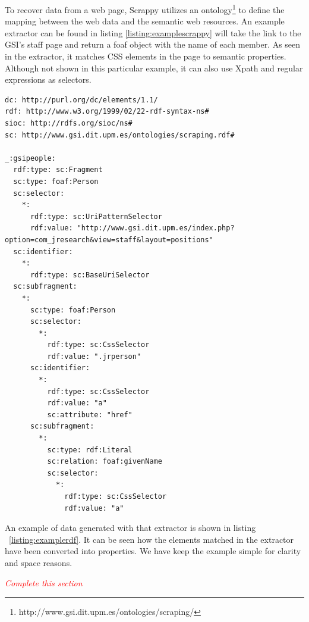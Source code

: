 To recover data from a web page, Scrappy utilizes an ontology\footnote{http://www.gsi.dit.upm.es/ontologies/scraping/} to define the mapping between the web data and the semantic web resources. An example extractor can be found in listing \ref{listing:examplescrappy} will take the link to the GSI's staff page and return a foaf object with the name of each member. As seen in the extractor, it matches CSS elements in the page to semantic properties. Although not shown in this particular example, it can also use Xpath and regular expressions as selectors.

\begin{center} 
  \begin{lstlisting}[language={}, captionpos=b, caption=Example extractor, label=listing:examplescrappy]   
dc: http://purl.org/dc/elements/1.1/
rdf: http://www.w3.org/1999/02/22-rdf-syntax-ns#
sioc: http://rdfs.org/sioc/ns#
sc: http://www.gsi.dit.upm.es/ontologies/scraping.rdf#

_:gsipeople:
  rdf:type: sc:Fragment
  sc:type: foaf:Person
  sc:selector:
    *:
      rdf:type: sc:UriPatternSelector
      rdf:value: "http://www.gsi.dit.upm.es/index.php?option=com_jresearch&view=staff&layout=positions"
  sc:identifier:
    *:
      rdf:type: sc:BaseUriSelector
  sc:subfragment:
    *:
      sc:type: foaf:Person
      sc:selector:
        *:
          rdf:type: sc:CssSelector
          rdf:value: ".jrperson"
      sc:identifier:
        *:
          rdf:type: sc:CssSelector
          rdf:value: "a"
          sc:attribute: "href"
      sc:subfragment:
        *:
          sc:type: rdf:Literal
          sc:relation: foaf:givenName
          sc:selector:
            *:
              rdf:type: sc:CssSelector
              rdf:value: "a"
  \end{lstlisting}
\end{center}

An example of data generated with that extractor is shown in listing ~\ref{listing:examplerdf}. It can be seen how the elements matched in the extractor have been converted into properties. We have keep the example simple for clarity and space reasons.

\emph{\textcolor{red}{Complete this section}}

\begin{center}
  
\end{center}

